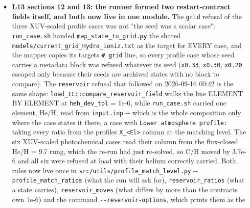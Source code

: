 \documentclass[english,a4paper]{my_memo}
\begin{document}
\begin{itemize}
  THREE chains then refuse at 0.02 in the same shape -\/- hydro \texttt{info\ =\ 2} at
  every outer pass with the worst row within 0.005 R\_p of the base and
  \texttt{lam}/\texttt{dtau} walking down from a 1e8 start -\/- independently of the helium
  abundance and of the lower-atmosphere treatment, and at a step (a factor
  1.5) gentler than the 0.05 -\textgreater{} 0.03 that certified on every chain. On the
  one rung that ran its full 40-pass budget the gated elemental row fell
  2.95E-02 -\textgreater{} 4.58E-08, four decades INSIDE its tolerance, with \texttt{omega} at
  0.500 and no halving, so the composition is not what refuses these states
  and the block is in the wind half. The ladders reach 0.03; the three 0.01
  cases are NOT CERTIFIED and are handed to item L4h.
\item
  \textbf{L13 sections 12 and 13: the runner formed two restart-contract fields
  itself, and both now live in one module.} The \texttt{grid} refusal of the three
  XUV-scaled profile cases was not "the seed was a scalar case": \texttt{run\_case.sh}
  handed \texttt{map\_state\_to\_grid.py} the shared
  \texttt{models/current\_grid\_Hydro\_ioniz.txt} as the target for EVERY case, and the
  mapper copies its target\textquotesingle s \texttt{\#\ grid} line, so every profile case whose seed
  carries a metadata block was refused whatever its seed
  (\texttt{x0.33}, \texttt{x0.30}, \texttt{x0.20} escaped only because their seeds are archived
  states with no block to compare). The \texttt{reservoir} refusal that followed on
  2026-09-16 00:42 is the same shape: \texttt{load\_IC::compare\_reservoir\_field} walks
  the line ELEMENT BY ELEMENT at \texttt{heh\_dev\_tol} = 1e-6, while \texttt{run\_case.sh}
  carried one element, He/H, read from \texttt{input.inp} -\/- which is the whole
  composition only where the case states it there, a case with
  \texttt{Lower\ atmosphere\ profile:} taking every ratio from the profile\textquotesingle s \texttt{X\_\textless{}El\textgreater{}}
  column at the matching level. The six XUV-scaled photochemical cases read
  their column from the flux-closed He/H = 9.7 rung, which the re-run had just
  re-solved, so C/H moved by 3.7e-6 and all six were refused at load with
  their helium correctly carried. Both rules now live once in
  \texttt{src/utils/profile\_match\_level.py} -\/- \texttt{profile\_match\_ratios} (what the run
  will ask for), \texttt{reservoir\_ratios} (what a state carries),
  \texttt{reservoir\_moves} (what differs by more than the contract\textquotesingle s own 1e-6) and
  the command \texttt{-\/-reservoir-options}, which prints them as the

\end{itemize}
\end{document}
